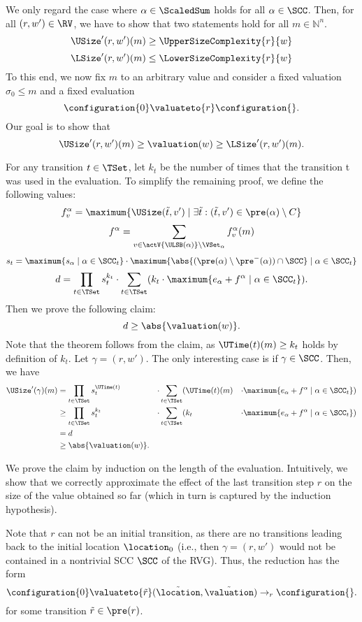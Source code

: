 We only regard the case where $\alpha \in \ScaledSum$ holds for all $\alpha \in \SCC$.
Then, for all $(r, w') \in \RV$, we have to show that two statements hold for all $m \in \mathbb{N}^n$.
\[ \USize'(r, w')(m) \geq \UpperSizeComplexity{r}{w} \]
\[ \LSize'(r, w')(m) \leq \LowerSizeComplexity{r}{w} \]
To this end, we now fix $m$ to an arbitrary value and consider a fixed valuation $\sigma_0 \leq m$ and a fixed evaluation
\[ \configuration{0} \valuateto{r} \configuration{}. \]
Our goal is to show that
\[ \USize'(r, w')(m) \geq \valuation(w) \geq \LSize'(r, w')(m). \]

For any transition $t \in \TSet$, let $k_t$ be the number of times that the transition t was used in the evaluation.
To simplify the remaining proof, we define the following values:
\[ f^\alpha_v = \maximum{\USize(\tilde{t}, v') \mid \exists \tilde{t}: (\tilde{t}, v') \in \pre(\alpha) \setminus C} \]
\[ f^\alpha = \sum_{v \in \actV{\ULSB(\alpha)} \setminus \VSet_\alpha} f^\alpha_v(m) \]
\[ s_t = \maximum{s_{\alpha} \mid \alpha \in \SCC_t} \cdot \maximum{\abs{(\pre(\alpha) \setminus \pre^-(\alpha)) \cap \SCC} \mid \alpha \in \SCC_t} \]
\[ d = \prod_{t \in \TSet} s^{k_t}_t \cdot \sum_{t \in \TSet} (k_t \cdot \maximum{e_\alpha + f^\alpha \mid \alpha \in \SCC_t}). \]
Then we prove the following claim:
\[ d \geq \abs{\valuation(w)}. \]
Note that the theorem follows from the claim, as $\UTime(t)(m) \geq k_t$ holds by definition of $k_t$.
Let $\gamma = (r, w')$.
The only interesting case is if $\gamma \in \SCC$.
Then, we have
\begin{align*}
  \USize'(\gamma)(m) &= \prod_{t \in \TSet} s_t^{\UTime(t)} & \cdot \sum_{t \in \TSet} (& \UTime(t)(m) & \cdot \maximum{ e_\alpha + f^\alpha \mid \alpha \in \SCC_t }) \\
  & \geq \prod_{t \in \TSet} s_t^{k_t} & \cdot \sum_{t \in \TSet} (& k_t & \cdot \maximum{ e_\alpha + f^\alpha \mid \alpha \in \SCC_t }) \\
  &= d \\
  & \geq \abs{\valuation(w)}.
\end{align*}

We prove the claim by induction on the length of the evaluation.
Intuitively, we show that we correctly approximate the effect of the last transition step $r$ on the size of the value obtained so far (which in turn is captured by the induction hypothesis).

Note that $r$ can not be an initial transition, as there are no transitions leading back to the initial location $\location_0$
(i.e., then $\gamma = (r, w')$ would not be contained in a nontrivial SCC $\SCC$ of the RVG).
Thus, the reduction has the form
\[ \configuration{0} \valuateto{\tilde{r}} (\tilde{\location}, \tilde{\valuation}) \rightarrow_r \configuration{}. \]
for some transition $\tilde{r} \in \pre(r)$.


